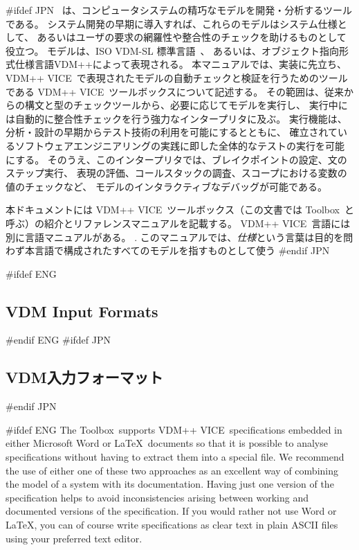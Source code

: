 \documentclass[\pformat,12pt]{article}
\newcommand{\vdmslpp}{VDM-SL}
\newcommand{\Toolbox}{Toolbox}
\newcommand{\vdmslpp}{VDM++}
\newcommand{\Toolbox}{Toolbox}
\renewcommand{\vdmslpp}{VDM++ VICE}
\begin{document}
#ifdef JPN
\VDMTools\ は、コンピュータシステムの精巧なモデルを開発・分析するツールである。
システム開発の早期に導入すれば、これらのモデルはシステム仕様として、
あるいはユーザの要求の網羅性や整合性のチェックを助けるものとして役立つ。
モデルは、ISO VDM-SL 標準言語~\cite{ISOVDM96}、
あるいは、オブジェクト指向形式仕様言語VDM++\cite{LangManPP-SCSK}\cite{Fitzgerald&05}によって表現される。
本マニュアルでは、実装に先立ち、 \vdmslpp\ で表現されたモデルの自動チェックと検証を行うためのツールである
 \vdmslpp\ ツールボックスについて記述する。
その範囲は、従来からの構文と型のチェックツールから、必要に応じてモデルを実行し、
実行中には自動的に整合性チェックを行う強力なインタープリタに及ぶ。
実行機能は、分析・設計の早期からテスト技術の利用を可能にするとともに、
確立されているソフトウェアエンジニアリングの実践に即した全体的なテストの実行を可能にする。
そのうえ、このインタープリタでは、ブレイクポイントの設定、文のステップ実行、
表現の評価、コールスタックの調査、スコープにおける変数の値のチェックなど、
モデルのインタラクティブなデバッグが可能である。

本ドキュメントには \vdmslpp\ ツールボックス（この文書では \Toolbox\ と呼ぶ）の紹介とリファレンスマニュアルを記載する。
\vdmslpp\ 言語には別に言語マニュアルがある。
.
このマニュアルでは、{\em 仕様\/}という言葉は目的を問わず本言語で構成されたすべてのモデルを指すものとして使う
#endif JPN

#ifdef ENG
\subsection*{VDM Input Formats}
#endif ENG
#ifdef JPN
\subsection*{VDM入力フォーマット}
#endif JPN

#ifdef ENG
The \Toolbox\ supports \vdmslpp\ specifications embedded in either
Microsoft Word or \LaTeX\ documents so that it is possible to analyse
specifications without having to extract them into a special file. We
recommend the use of either one of these two approaches as an
excellent way of combining the model of a system with its
documentation. Having just one version of the specification helps to
avoid inconsistencies arising between working and documented versions
of the specification. If you would rather not use Word or \LaTeX, you
can of course write specifications as clear text in plain ASCII files
using your preferred text editor.
\end{document}
